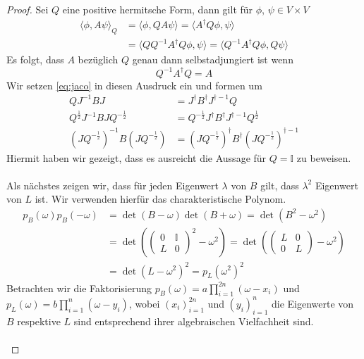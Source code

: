 \documentclass[11pt,a4paper,leqno]{report}
\numberwithin{equation}{chapter}
\begin{document}
\begin{proof}
	Sei $Q$ eine positive hermitsche Form, dann gilt f\"ur $\phi$, $\psi\in V\times V$
	\begin{align*}
	\langle\phi, A\psi\rangle_Q &= \langle\phi, QA\psi\rangle = \langle A^\dagger Q\phi, \psi\rangle\\&=\langle QQ^{-1}A^\dagger Q\phi, \psi\rangle=\langle Q^{-1}A^\dagger Q\phi, Q\psi\rangle	\end{align*}
Es folgt, dass $A$ bez\"uglich $Q$ genau dann selbstadjungiert ist wenn
\begin{equation*}
	Q^{-1}A^\dagger Q = A
\end{equation*}
Wir setzen \eqref{eq:jaco} in diesen Ausdruck ein und formen um
\begin{align*}
	QJ^{-1}BJ&=J^\dagger B^\dagger J^{\dagger-1}Q\\
	Q^{\frac{1}{2}}J^{-1}BJQ^{-\frac{1}{2}}&=Q^{-\frac{1}{2}}J^\dagger B^\dagger J^{\dagger-1}Q^{\frac{1}{2}}\\
	(JQ^{-\frac{1}{2}})^{-1}B(JQ^{-\frac{1}{2}})&=
	(JQ^{-\frac{1}{2}})^\dagger B^\dagger(JQ^{-\frac{1}{2}})^{\dagger-1}
\end{align*}
Hiermit haben wir gezeigt, dass es ausreicht die Aussage f\"ur $Q=\mathbb{I}$ zu beweisen.\\
\\
Als n\"achstes zeigen wir, dass f\"ur jeden Eigenwert $\lambda$ von $B$ gilt, dass $\lambda^2$ Eigenwert von $L$ ist. Wir verwenden hierf\"ur das charakteristische Polynom.
\begin{align*}
	p_{B}(\omega)p_{B}(-\omega)&= \det(B-\omega)\det(B+\omega)=\det(B^2-\omega^2)\\
	&=\det(\begin{pmatrix}
		0 & \mathbb{I} \\ 
		L & 0
	\end{pmatrix}^2-\omega^2)=\det(\begin{pmatrix}
	L & 0 \\ 
	0 & L
\end{pmatrix}-\omega^2)\\
&= \det(L-\omega^2)^2=p_{L}(\omega^2)^2
\end{align*}
Betrachten wir die Faktorisierung $p_{B}(\omega)=a\prod_{i=1}^{2n}(\omega-x_i)$ und $p_{L}(\omega)=b\prod_{i=1}^n(\omega-y_i)$, wobei $(x_i)_{i=1}^{2n}$ und $(y_i)_{i=1}^n$ die Eigenwerte von $B$ respektive $L$ sind entsprechend ihrer algebraischen Vielfachheit sind.\\
\\

\end{proof}
\end{document}
